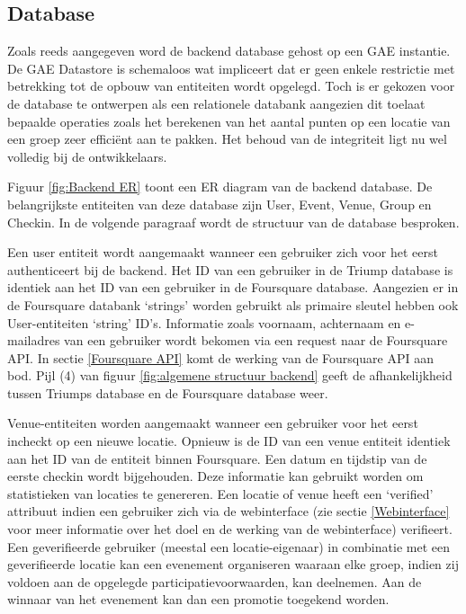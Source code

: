 \subsection{Database}
Zoals reeds aangegeven word de backend database gehost op een GAE instantie. De GAE Datastore is schemaloos wat impliceert dat er geen enkele restrictie met betrekking tot de opbouw van entiteiten wordt opgelegd. Toch is er gekozen voor de database te ontwerpen als een relationele databank aangezien dit toelaat bepaalde operaties zoals het berekenen van het aantal punten op een locatie van een groep zeer efficiënt aan te pakken. Het behoud van de integriteit ligt nu wel volledig bij de ontwikkelaars. 

Figuur \ref{fig:Backend ER} toont een ER diagram van de backend database.  De belangrijkste entiteiten van deze database zijn User, Event, Venue, Group en Checkin. In de volgende paragraaf wordt de structuur van de database besproken. 

Een user entiteit wordt aangemaakt wanneer een gebruiker zich voor het eerst authenticeert bij de backend. Het ID van een gebruiker in de Triump database is identiek aan het ID van een gebruiker in de Foursquare database. Aangezien er in de Foursquare databank `strings' worden gebruikt als primaire sleutel hebben ook User-entiteiten `string' ID's.  Informatie zoals voornaam, achternaam en e-mailadres van een gebruiker wordt bekomen via een request naar de Foursquare API. In sectie \ref{Foursquare API} komt de werking van de Foursquare API aan bod. Pijl (4) van figuur \ref{fig:algemene structuur backend} geeft de afhankelijkheid tussen Triumps database en de Foursquare database weer.

Venue-entiteiten worden aangemaakt wanneer een gebruiker voor het eerst incheckt op een nieuwe locatie. Opnieuw is de ID van een venue entiteit identiek aan het ID van de entiteit binnen Foursquare. Een datum en tijdstip van de eerste checkin wordt bijgehouden. Deze informatie kan gebruikt worden om statistieken van locaties te genereren. Een locatie of venue heeft een `verified' attribuut indien een gebruiker zich via de webinterface (zie sectie \ref{Webinterface} voor meer informatie over het doel en de werking van de webinterface) verifieert. Een geverifieerde gebruiker (meestal een locatie-eigenaar) in combinatie met een geverifieerde locatie kan een evenement organiseren waaraan elke groep, indien zij voldoen aan de opgelegde participatievoorwaarden, kan deelnemen. Aan de winnaar van het evenement kan dan een promotie toegekend worden.

